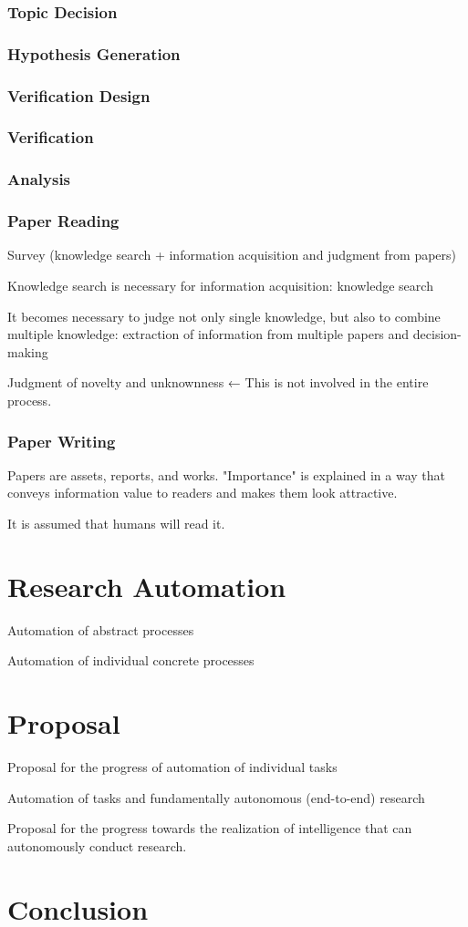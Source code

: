 \documentclass{article}
\begin{document}
\subsubsection{Topic Decision}
\subsubsection{Hypothesis Generation}
\subsubsection{Verification Design}
\subsubsection{Verification}
\subsubsection{Analysis}
\subsubsection{Paper Reading}
Survey (knowledge search + information acquisition and judgment from papers)

Knowledge search is necessary for information acquisition: knowledge search

It becomes necessary to judge not only single knowledge, but also to combine multiple knowledge: extraction of information from multiple papers and decision-making

Judgment of novelty and unknownness ← This is not involved in the entire process.
\subsubsection{Paper Writing}

Papers are assets, reports, and works.
"Importance" is explained in a way that conveys information value to readers and makes them look attractive.

It is assumed that humans will read it.

\section{Research Automation}

Automation of abstract processes

Automation of individual concrete processes

\section{Proposal}

Proposal for the progress of automation of individual tasks

Automation of tasks and fundamentally autonomous (end-to-end) research

Proposal for the progress towards the realization of intelligence that can autonomously conduct research.

\section{Conclusion}
\end{document}
